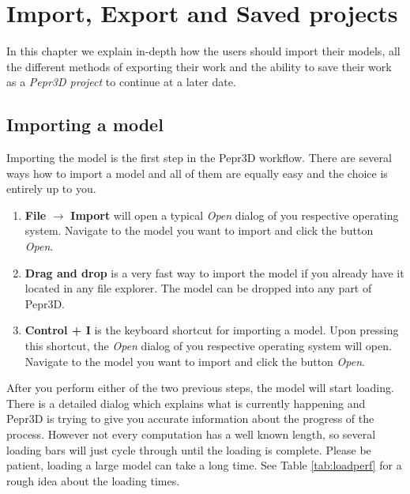 \chapter{Import, Export and Saved projects}
\label{ch:impexp}

In this chapter we explain in-depth how the users should import their models, all the different methods of exporting their work and the ability to save their work as a \textit{Pepr3D project} to continue at a later date.

\section{Importing a model}

Importing the model is the first step in the Pepr3D workflow. There are several ways how to import a model and all of them are equally easy and the choice is entirely up to you.

\begin{enumerate}
\item \textbf{File} $\rightarrow$ \textbf{Import} will open a typical \textit{Open} dialog of you respective operating system. Navigate to the model you want to import and click the button \textit{Open}.

\item \textbf{Drag and drop} is a very fast way to import the model if you already have it located in any file explorer. The model can be dropped into any part of Pepr3D.

\item \textbf{Control + I} is the keyboard shortcut for importing a model. Upon pressing this shortcut, the \textit{Open} dialog of you respective operating system will open. Navigate to the model you want to import and click the button \textit{Open}.

\end{enumerate}

After you perform either of the two previous steps, the model will start loading. There is a detailed dialog which explains what is currently happening and Pepr3D is trying to give you accurate information about the progress of the process. However not every computation has a well known length, so several loading bars will just cycle through until the loading is complete. Please be patient, loading a large model can take a long time. See Table \ref{tab:loadperf} for a rough idea about the loading times.


